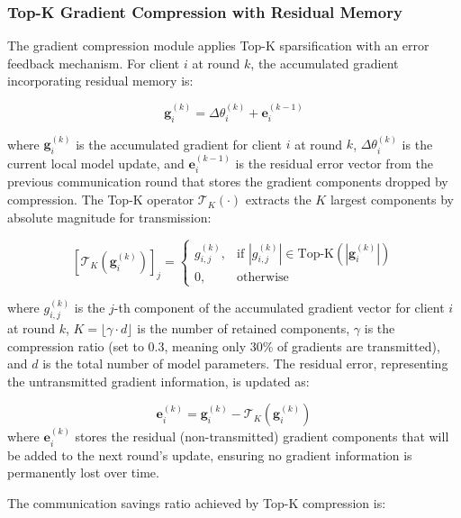 \documentclass[journal]{IEEEtran}
\begin{document}
\subsubsection{Top-K Gradient Compression with Residual Memory}
The gradient compression module applies Top-K sparsification with an error feedback mechanism. For client $i$ at round $k$, the accumulated gradient incorporating residual memory is:

\begin{equation}
\mathbf{g}_i^{(k)} = \Delta\theta_i^{(k)} + \mathbf{e}_i^{(k-1)}
\label{eq:accum_grad}
\end{equation}

\noindent where $\mathbf{g}_i^{(k)}$ is the accumulated gradient for client $i$ at round $k$, $\Delta\theta_i^{(k)}$ is the current local model update, and $\mathbf{e}_i^{(k-1)}$ is the residual error vector from the previous communication round that stores the gradient components dropped by compression. The Top-K operator $\mathcal{T}_K(\cdot)$ extracts the $K$ largest components by absolute magnitude for transmission:

\begin{equation}
\left[\mathcal{T}_K\left(\mathbf{g}_i^{(k)}\right)\right]_j = 
\begin{cases}
g_{i,j}^{(k)}, & \text{if } |g_{i,j}^{(k)}| \in \text{Top-K}\left(|\mathbf{g}_i^{(k)}|\right) \\
0, & \text{otherwise}
\end{cases}
\label{eq:topk}
\end{equation}

\noindent where $g_{i,j}^{(k)}$ is the $j$-th component of the accumulated gradient vector for client $i$ at round $k$, $K = \lfloor \gamma \cdot d \rfloor$ is the number of retained components, $\gamma$ is the compression ratio (set to 0.3, meaning only 30\% of gradients are transmitted), and $d$ is the total number of model parameters. The residual error, representing the untransmitted gradient information, is updated as:

\begin{equation}
\mathbf{e}_i^{(k)} = \mathbf{g}_i^{(k)} - \mathcal{T}_K\left(\mathbf{g}_i^{(k)}\right)
\label{eq:residual}
\end{equation}
\noindent where $\mathbf{e}_i^{(k)}$ stores the residual (non-transmitted) gradient components that will be added to the next round's update, ensuring no gradient information is permanently lost over time.

The communication savings ratio achieved by Top-K compression is:
\end{document}
